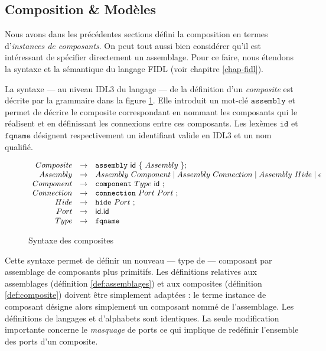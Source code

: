 \subsection{Composition \& Mod\`eles}

Nous avons dans les pr\'ec\'edentes sections d\'efini la
composition en termes d'\emph{instances de composants}. On peut tout
aussi bien consid\'erer qu'il est int\'eressant de sp\'ecifier
directement un assemblage. Pour ce faire, nous \'etendons la syntaxe
et la s\'emantique du langage \textsf{FIDL} (voir chapitre
\ref{chap-fidl}). 

La syntaxe --- au niveau \textsf{IDL3} du langage --- de la
d\'efinition d'un \emph{composite}  est d\'ecrite 
par la grammaire dans la figure \ref{fig-syn-fidl-assm}. Elle
introduit un mot-cl\'e $\mathtt{assembly}$  et permet
de d\'ecrire le composite correspondant en nommant les composants qui
le r\'ealisent et en d\'efinissant les connexions entre ces
composants. 
Les lex\`emes $\mathtt{id}$ et $\mathtt{fqname}$ d\'esignent
respectivement un identifiant valide en \textsf{IDL3} et un nom
qualifi\'e.

\begin{figure}
    \begin{equation}
        \label{eq:syn-fidl-assm}\begin{array}{r@{\quad\rightarrow\quad}l}
            Composite & \mathtt{assembly}\ \mathsf{id}\ \mathtt{\{}\
              Assembly\ \mathtt{\} ;} \\
            Assembly & Assembly\ Component \mid Assembly\ Connection 
            \mid Assembly\ Hide\mid \epsilon \\
            Component & \mathtt{component}\ Type\ \mathsf{id}\ \mathtt{;}  \\
            Connection & \mathtt{connection}\ Port\ Port\ \mathtt{;}  \\
            Hide & \mathtt{hide}\ Port\ \mathtt{;}  \\
            Port & \mathsf{id}.\mathsf{id} \\
            Type & \mathtt{fqname}
        \end{array}
    \end{equation}
    \caption{Syntaxe des composites}
    \label{fig-syn-fidl-assm}
\end{figure}

Cette syntaxe permet de d\'efinir un nouveau --- type de ---
composant par assemblage de composants plus primitifs. Les
d\'efinitions relatives aux assemblages (d\'efinition
\ref{def:assemblages}) et aux composites (d\'efinition \ref{def:composite}) doivent
\^etre simplement adapt\'ees : le terme instance de composant
d\'esigne alors simplement un composant nomm\'e de l'assemblage. Les
d\'efinitions de langages et d'alphabets sont identiques. La seule
modification importante concerne le \emph{masquage} de ports ce qui
implique de red\'efinir l'ensemble des ports d'un composite.

